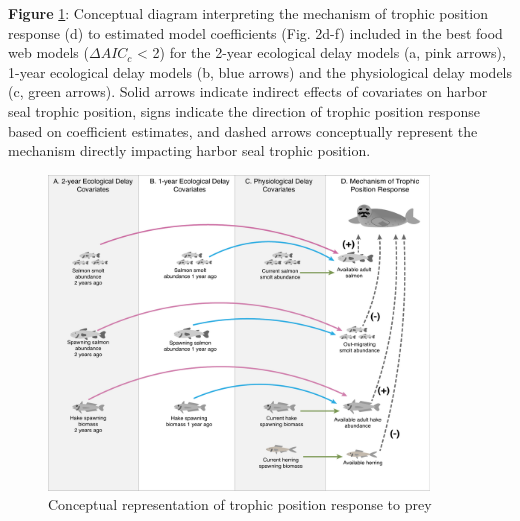 \documentclass [11pt, proquest] {uwthesis}[2015/03/03]
\begin{document}
\textbf{Figure} \ref{fig:conceptual}: Conceptual diagram interpreting
the mechanism of trophic position response (d) to estimated model
coefficients (Fig. 2d-f) included in the best food web models
(\(\Delta AIC_c\) \textless{} 2) for the 2-year ecological delay models
(a, pink arrows), 1-year ecological delay models (b, blue arrows) and
the physiological delay models (c, green arrows). Solid arrows indicate
indirect effects of covariates on harbor seal trophic position, signs
indicate the direction of trophic position response based on coefficient
estimates, and dashed arrows conceptually represent the mechanism
directly impacting harbor seal trophic position. \newline 
\begin{figure}[h]
\centering
  \includegraphics[width=0.9\textwidth]{figure/Ch3/Figure3.pdf}
  \caption{Conceptual representation of trophic position response to prey}
  \label{fig:conceptual}
\end{figure}
\clearpage
\end{document}
